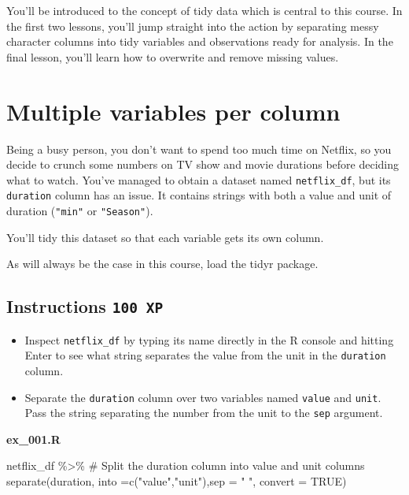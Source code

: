 \documentclass[
  letterpaper,
  DIV=11,
  numbers=noendperiod]{scrreprt}
\newenvironment{Shaded}{\begin{snugshade}}{\end{snugshade}}
\newcommand{\AttributeTok}[1]{\textcolor[rgb]{0.40,0.45,0.13}{#1}}
\newcommand{\CommentTok}[1]{\textcolor[rgb]{0.37,0.37,0.37}{#1}}
\newcommand{\ConstantTok}[1]{\textcolor[rgb]{0.56,0.35,0.01}{#1}}
\newcommand{\FunctionTok}[1]{\textcolor[rgb]{0.28,0.35,0.67}{#1}}
\newcommand{\NormalTok}[1]{\textcolor[rgb]{0.00,0.23,0.31}{#1}}
\newcommand{\SpecialCharTok}[1]{\textcolor[rgb]{0.37,0.37,0.37}{#1}}
\newcommand{\StringTok}[1]{\textcolor[rgb]{0.13,0.47,0.30}{#1}}
\providecommand{\tightlist}{%
  \setlength{\itemsep}{0pt}\setlength{\parskip}{0pt}}\usepackage{longtable,booktabs,array}
\begin{document}
You'll be introduced to the concept of tidy data which is central to
this course. In the first two lessons, you'll jump straight into the
action by separating messy character columns into tidy variables and
observations ready for analysis. In the final lesson, you'll learn how
to overwrite and remove missing values.

\hypertarget{multiple-variables-per-column}{%
\section{Multiple variables per
column}\label{multiple-variables-per-column}}

Being a busy person, you don't want to spend too much time on Netflix,
so you decide to crunch some numbers on TV show and movie durations
before deciding what to watch. You've managed to obtain a dataset named
\texttt{netflix\_df}, but its \texttt{duration} column has an issue. It
contains strings with both a value and unit of duration (\texttt{"min"}
or \texttt{"Season"}).

You'll tidy this dataset so that each variable gets its own column.

As will always be the case in this course, load the tidyr package.

\hypertarget{instructions-100-xp}{%
\subsection*{\texorpdfstring{Instructions
\texttt{100\ XP}}{Instructions 100 XP}}\label{instructions-100-xp}}

\begin{itemize}
\tightlist
\item
  Inspect \texttt{netflix\_df} by typing its name directly in the R
  console and hitting Enter to see what string separates the value from
  the unit in the \texttt{duration} column.
\item
  Separate the \texttt{duration} column over two variables named
  \texttt{value} and \texttt{unit}. Pass the string separating the
  number from the unit to the \texttt{sep} argument.
\end{itemize}

\textbf{ex\_001.R}

\begin{Shaded}
\begin{Highlighting}[]
\NormalTok{netflix\_df }\SpecialCharTok{\%\textgreater{}\%} 
  \CommentTok{\# Split the duration column into value and unit columns}
  \FunctionTok{separate}\NormalTok{(duration, }\AttributeTok{into =}\FunctionTok{c}\NormalTok{(}\StringTok{"value"}\NormalTok{,}\StringTok{"unit"}\NormalTok{),}\AttributeTok{sep =} \StringTok{" "}\NormalTok{, }\AttributeTok{convert =} \ConstantTok{TRUE}\NormalTok{)}
\end{Highlighting}
\end{Shaded}
\end{document}
